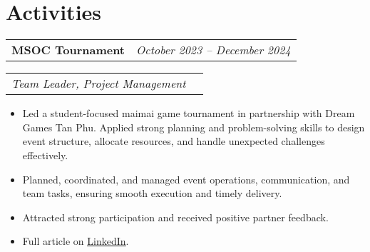 \documentclass[a4paper,11pt]{article}
\begin{document}
\section{Activities}
\begin{spacing}{1.05}
\begin{tabularx}{\linewidth}{@{}l r@{}}
  \textbf{MSOC Tournament} & \hspace*{0.54\linewidth}\normalsize\textit{October 2023 -- December 2024} \\
\end{tabularx}
\begin{tabularx}{\linewidth}{@{}l r@{}}
  \normalsize\textit{Team Leader, Project Management} 
  \end{tabularx}
\begin{itemize}[nosep,leftmargin=1.2em,itemsep=2pt]
  \item Led a student-focused maimai game tournament in partnership with Dream Games Tan Phu. Applied strong planning and problem-solving skills to design event structure, allocate resources, and handle unexpected challenges effectively.
  \item Planned, coordinated, and managed event operations, communication, and team tasks, ensuring smooth execution and timely delivery.
  \item Attracted strong participation and received positive partner feedback.
  \item Full article on \href{https://www.linkedin.com/feed/update/urn:li:activity:7300042302784233472/}{\underline{LinkedIn}}.
\end{itemize}
\end{spacing}




\vspace*{\fill}
\end{document}
